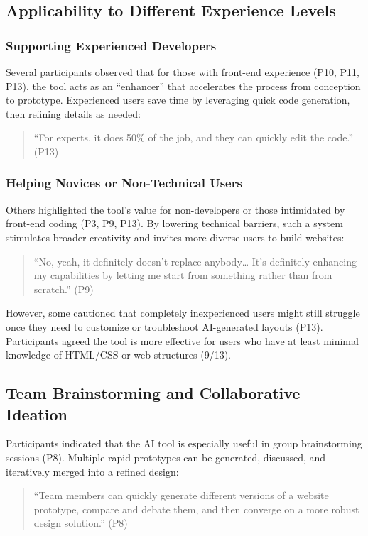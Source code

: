 \subsection{Applicability to Different Experience Levels}
\subsubsection{Supporting Experienced Developers}
Several participants observed that for those with front-end experience (P10, P11, P13), the tool acts as an ``enhancer'' that accelerates the process from conception to prototype. Experienced users save time by leveraging quick code generation, then refining details as needed:

\begin{quote}
``For experts, it does 50\% of the job, and they can quickly edit the code.'' (P13)
\end{quote}

\subsubsection{Helping Novices or Non-Technical Users}
Others highlighted the tool's value for non-developers or those intimidated by front-end coding (P3, P9, P13). By lowering technical barriers, such a system stimulates broader creativity and invites more diverse users to build websites:

\begin{quote}
``No, yeah, it definitely doesn't replace anybody… It's definitely enhancing my capabilities by letting me start from something rather than from scratch.'' (P9)
\end{quote}

However, some cautioned that completely inexperienced users might still struggle once they need to customize or troubleshoot AI-generated layouts (P13). Participants agreed the tool is more effective for users who have at least minimal knowledge of HTML/CSS or web structures (9/13).

\subsection{Team Brainstorming and Collaborative Ideation}
Participants indicated that the AI tool is especially useful in group brainstorming sessions (P8). Multiple rapid prototypes can be generated, discussed, and iteratively merged into a refined design:

\begin{quote}
``Team members can quickly generate different versions of a website prototype, compare and debate them, and then converge on a more robust design solution.'' (P8)
\end{quote}

